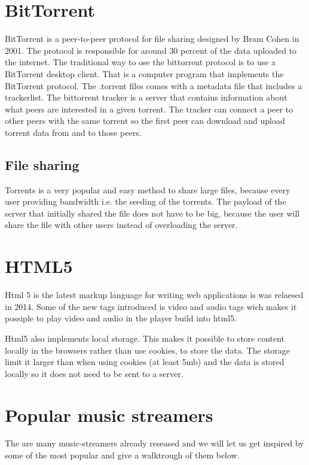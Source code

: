 \section{BitTorrent}
BitTorrent \citep{bittorrent:bep03} is a peer-to-peer protocol for file sharing designed by Bram Cohen in 2001.
The protocol is responsible for around 30 percent of the data uploaded to the internet.
The traditional way to ose the bittorrent protocol is to use a BitTorrent desktop client. That is a computer program that implements the BitTorrent protocol.
The .torrent files comes with a metadata file that includes a trackerlist. The bittorrent tracker is a server that contains information about what peers are interested in a given torrent. The tracker can connect a peer to other peers with the same torrent so the first peer can download and upload torrent data from and to those peers.

\subsection{File sharing}
Torrents is a very popular and easy method to share large files, because every user providing bandwidth i.e. the seeding of the torrents.
The payload of the server that initially shared the file does not have to be big, because the user will share the file with other users instead of overloading the server.

\section{HTML5}
Html 5 is the latest markup language for writing web applications is was relaesed in 2014. Some of the new tags introduced is video and audio tags wich makes it possiple to play video and audio in the player build into html5.

Html5 also implements local storage. This makes it possible to store content locally in the browsers rather than use cookies, to store the data.
The storage limit it larger than when using cookies (at least 5mb) and the data is stored locally so it does not need to be sent to a server.

\section{Popular music streamers}
The are many music-streamers already reseased and we will let us get inspired by some of the most popular and give a walktrough of them below.

